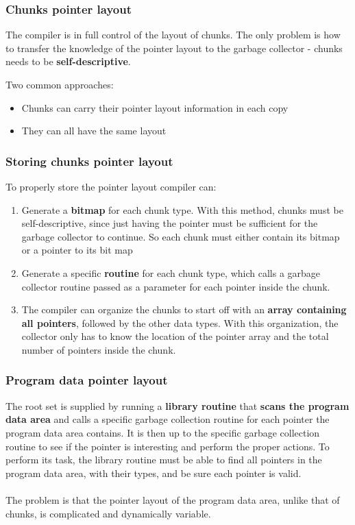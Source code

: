 \documentclass[presentation]{beamer}
\begin{document}
\begin{frame}
    \frametitle{Chunks pointer layout}
    \justifying
    The compiler is in full control of the layout of chunks. The only problem is how to transfer the knowledge of the pointer layout to the garbage collector - chunks needs to be \textbf{self-descriptive}.
    
    \begin{block}{Two common approaches:}
        \begin{itemize}
            \item Chunks can carry their pointer layout information in each copy
            \item They can all have the same layout
        \end{itemize}
    \end{block}
\end{frame}

\begin{frame}
    \frametitle{Storing chunks pointer layout}
    \justifying
    To properly store the pointer layout compiler can:
    
    \begin{enumerate}
        \item Generate a \textbf{bitmap} for each chunk type. With this method, chunks must be self-descriptive, since just having the pointer must be sufficient for the garbage collector to continue. So each chunk must either contain its bitmap or a pointer to its bit map
        \item Generate a specific \textbf{routine} for each chunk type, which calls a garbage collector routine passed as a parameter for each pointer inside the chunk.
        \item The compiler can organize the chunks to start off with an \textbf{array containing all pointers}, followed by the other data types. With this organization, the collector only has to know the location of the pointer array and the total number of pointers inside the chunk.
    \end{enumerate}
\end{frame}

\begin{frame}
    \frametitle{Program data pointer layout}
    \justifying
    The root set is supplied by running a \textbf{library routine} that \textbf{scans the program data area} and calls a specific garbage collection routine for each pointer the program data area contains. It is then up to the specific garbage collection routine to see if the pointer is interesting and perform the proper actions. To perform its task, the library routine must be able to find all pointers in the program data area, with their types, and be sure each pointer is valid.
    \\~\\
    The problem is that the pointer layout of the program data area, unlike that of chunks, is complicated and dynamically variable.
\end{frame}
\end{document}
